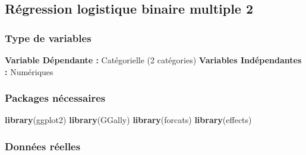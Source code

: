 \documentclass[
]{book}
\newenvironment{Shaded}{\begin{snugshade}}{\end{snugshade}}
\newcommand{\KeywordTok}[1]{\textcolor[rgb]{0.13,0.29,0.53}{\textbf{#1}}}
\newcommand{\NormalTok}[1]{#1}
\begin{document}
\hypertarget{ruxe9gression-logistique-binaire-multiple-2}{%
\subsection{Régression logistique binaire multiple 2}\label{ruxe9gression-logistique-binaire-multiple-2}}

\hypertarget{type-de-variables-10}{%
\subsubsection{Type de variables}\label{type-de-variables-10}}

\textbf{Variable Dépendante :} Catégorielle (2 catégories)
\textbf{Variables Indépendantes :} Numériques

\hypertarget{packages-nuxe9cessaires-10}{%
\subsubsection{Packages nécessaires}\label{packages-nuxe9cessaires-10}}

\begin{Shaded}
\begin{Highlighting}[]
\KeywordTok{library}\NormalTok{(ggplot2)}
\KeywordTok{library}\NormalTok{(GGally)}
\KeywordTok{library}\NormalTok{(forcats)}
\KeywordTok{library}\NormalTok{(effects)}
\end{Highlighting}
\end{Shaded}

\hypertarget{donnuxe9es-ruxe9elles-10}{%
\subsubsection{Données réelles}\label{donnuxe9es-ruxe9elles-10}}
\end{document}
